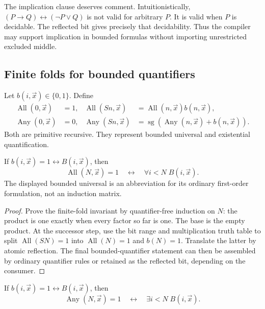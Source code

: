 The implication clause deserves comment.  Intuitionistically,
\((P\to Q)\leftrightarrow(\neg P\vee Q)\) is not valid for arbitrary \(P\).
It is valid when \(P\) is decidable.  The reflected bit gives precisely that
decidability.  Thus the compiler may support implication in bounded formulas
without importing unrestricted excluded middle.

\subsection{Finite folds for bounded quantifiers}

Let \(b(i,\vec x)\in\{0,1\}\).  Define
\begin{align*}
  \operatorname{All}(0,\vec x)&=1,
  &\operatorname{All}(S n,\vec x)&=
      \operatorname{All}(n,\vec x)b(n,\vec x),\\
  \operatorname{Any}(0,\vec x)&=0,
  &\operatorname{Any}(S n,\vec x)&=
      \operatorname{sg}(\operatorname{Any}(n,\vec x)+b(n,\vec x)).
\end{align*}
Both are primitive recursive.  They represent bounded universal and
existential quantification.

\begin{lemma}
\label{lem:all-reflect}
If \(b(i,\vec x)=1\leftrightarrow B(i,\vec x)\), then
\[
 \operatorname{All}(N,\vec x)=1
 \quad\leftrightarrow\quad
 \forall i<N\;B(i,\vec x).
\]
The displayed bounded universal is an abbreviation for its ordinary
first-order formulation, not an induction matrix.
\end{lemma}

\begin{proof}
Prove the finite-fold invariant by quantifier-free induction on \(N\): the
product is one exactly when every factor so far is one.  The base is the empty
product.  At the successor step, use the bit range and multiplication truth
table to split
\(\operatorname{All}(S N)=1\) into
\(\operatorname{All}(N)=1\) and \(b(N)=1\).  Translate the latter by atomic
reflection.  The final bounded-quantifier statement can then be assembled by
ordinary quantifier rules or retained as the reflected bit, depending on the
consumer.
\end{proof}

\begin{lemma}
\label{lem:any-reflect}
If \(b(i,\vec x)=1\leftrightarrow B(i,\vec x)\), then
\[
 \operatorname{Any}(N,\vec x)=1
 \quad\leftrightarrow\quad
 \exists i<N\;B(i,\vec x).
\]
\end{lemma}

